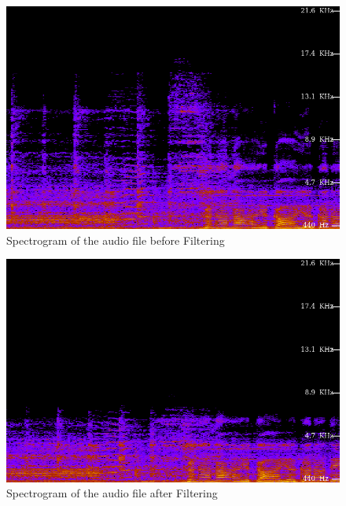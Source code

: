 \documentclass[journal,12pt,twocolumn]{IEEEtran}
\theoremstyle{remark}
\begin{document}
\begin{enumerate}[label=\thesection.\arabic*,ref=\thesection.\theenumi]
\begin{figure}[ht]
    \includegraphics[width=0.8\columnwidth]{figs/Spectogram.png}
    \caption{Spectrogram of the audio file before Filtering}
    \label{fig:before_filter_plot}
\end{figure}
\begin{figure}[ht]
\includegraphics[width=0.8\columnwidth]{figs/Filtered_Spectogram.png}
    \caption{Spectrogram of the audio file after Filtering}
    \label{fig:after_filter_plot}
\end{figure}

\end{enumerate}
\end{document}
